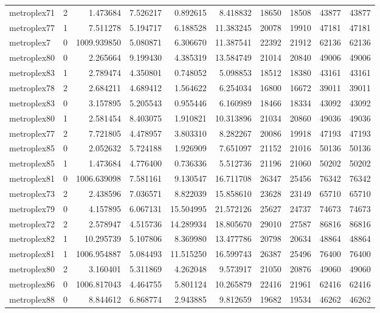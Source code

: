 \begin{longtable}{|l|r|r|r|r|r|r|r|r|r|}
metroplex71 & 2 & 1.473684 & 7.526217 & 0.892615 & 8.418832 & 18650 & 18508 & 43877 & 43877 \\
metroplex77 & 1 & 7.511278 & 5.194717 & 6.188528 & 11.383245 & 20078 & 19910 & 47181 & 47181 \\
metroplex7 & 0 & 1009.939850 & 5.080871 & 6.306670 & 11.387541 & 22392 & 21912 & 62136 & 62136 \\
metroplex80 & 0 & 2.265664 & 9.199430 & 4.385319 & 13.584749 & 21014 & 20840 & 49006 & 49006 \\
metroplex83 & 1 & 2.789474 & 4.350801 & 0.748052 & 5.098853 & 18512 & 18380 & 43161 & 43161 \\
metroplex78 & 2 & 2.684211 & 4.689412 & 1.564622 & 6.254034 & 16800 & 16672 & 39011 & 39011 \\
metroplex83 & 0 & 3.157895 & 5.205543 & 0.955446 & 6.160989 & 18466 & 18334 & 43092 & 43092 \\
metroplex80 & 1 & 2.581454 & 8.403075 & 1.910821 & 10.313896 & 21034 & 20860 & 49036 & 49036 \\
metroplex77 & 2 & 7.721805 & 4.478957 & 3.803310 & 8.282267 & 20086 & 19918 & 47193 & 47193 \\
metroplex85 & 0 & 2.052632 & 5.724188 & 1.926909 & 7.651097 & 21152 & 21016 & 50136 & 50136 \\
metroplex85 & 1 & 1.473684 & 4.776400 & 0.736336 & 5.512736 & 21196 & 21060 & 50202 & 50202 \\
metroplex81 & 0 & 1006.639098 & 7.581161 & 9.130547 & 16.711708 & 26347 & 25456 & 76342 & 76342 \\
metroplex73 & 2 & 2.438596 & 7.036571 & 8.822039 & 15.858610 & 23628 & 23149 & 65710 & 65710 \\
metroplex79 & 0 & 4.157895 & 6.067131 & 15.504995 & 21.572126 & 25627 & 24737 & 74673 & 74673 \\
metroplex72 & 2 & 2.578947 & 4.515736 & 14.289934 & 18.805670 & 29010 & 27587 & 86816 & 86816 \\
metroplex82 & 1 & 10.295739 & 5.107806 & 8.369980 & 13.477786 & 20798 & 20634 & 48864 & 48864 \\
metroplex81 & 1 & 1006.954887 & 5.084493 & 11.515250 & 16.599743 & 26387 & 25496 & 76400 & 76400 \\
metroplex80 & 2 & 3.160401 & 5.311869 & 4.262048 & 9.573917 & 21050 & 20876 & 49060 & 49060 \\
metroplex86 & 0 & 1006.817043 & 4.464755 & 5.801124 & 10.265879 & 22416 & 21961 & 62416 & 62416 \\
metroplex88 & 0 & 8.844612 & 6.868774 & 2.943885 & 9.812659 & 19682 & 19534 & 46262 & 46262 \\

\end{longtable}
